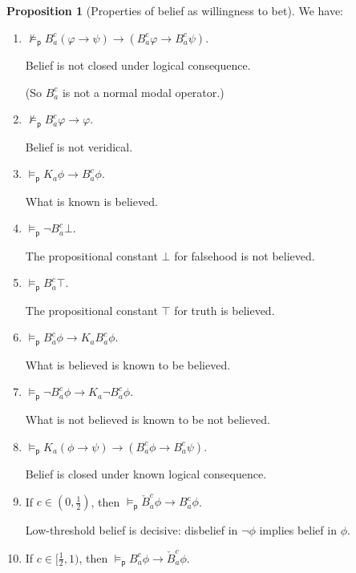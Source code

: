 \documentclass[12pt]{article}
\theoremstyle{definition}
\newtheorem{proposition}[theorem]{Proposition}
\newcommand{\modelsp}{\models_{\mathsf{p}}}                  %
\begin{document}
\begin{proposition}[Properties of belief as willingness to bet]
  \label{prop:belief}
  We have:
  \begin{enumerate}
  \item \label{item:B-not-normal} $\not\modelsp
    B_a^c(\varphi\to\psi)\to(B_a^c\varphi\to B_a^c\psi)$.

    Belief is not closed under logical consequence.

    (So $B_a^c$ is not a normal modal operator.)

  \item \label{item:B-not-T} $\not\modelsp B_a^c\varphi\to\varphi$.

    Belief is not veridical.

  \item \label{item:B-C} $\modelsp K_a\phi\to B_a^c\phi$.

    What is known is believed.

  \item \label{item:B-B} $\modelsp\lnot B^c_a\bot$.

    The propositional constant $\bot$ for falsehood is not believed.

  \item \label{item:B-N} $\modelsp B_a^c\top$.

    The propositional constant $\top$ for truth is believed.

  \item \label{item:B-Ap} $\modelsp B_a^c\phi\to K_aB_a^c\phi$.

    What is believed is known to be believed.

  \item \label{item:B-An} $\modelsp \lnot B_a^c\phi\to K_a\lnot
    B_a^c\phi$.

    What is not believed is known to be not believed.

  \item \label{item:B-M} $\modelsp K_a(\phi\to\psi)\to(B_a^c\phi\to B_a^c\psi)$.

    Belief is closed under known logical consequence.

  \item \label{item:B-LT} If $c\in(0,\frac 12)$, then $\modelsp \check
    B_a^c\phi \to B_a^c\phi$.

    Low-threshold belief is decisive: disbelief in $\lnot\phi$ implies
    belief in $\phi$.

  \item \label{item:B-D} If $c\in[\frac 12,1)$, then $\modelsp
    B_a^c\phi\to \check B_a^c\phi$.


\end{enumerate}
\end{proposition}
\end{document}
